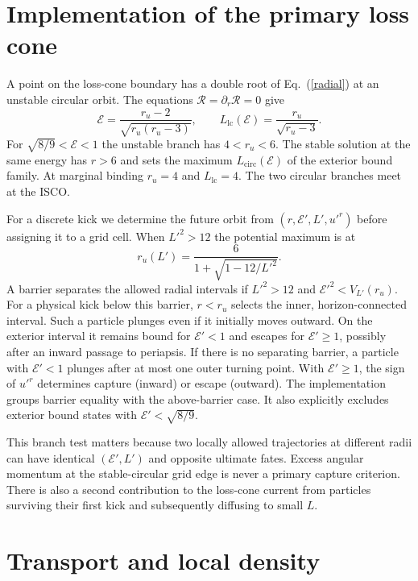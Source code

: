 \documentclass[aps,prd,reprint,amsmath,amssymb,nofootinbib]{revtex4-2}
\newcommand{\E}{\mathcal E}
\newcommand{\lc}{\mathrm{lc}}
\newcommand{\circsub}{\mathrm{circ}}
\begin{document}
\section{Implementation of the primary loss cone}
A point on the loss-cone boundary has a double root of Eq.~(\ref{radial}) at an unstable circular orbit. The equations $\mathcal R=\partial_r\mathcal R=0$ give~\cite{SFW}
\begin{equation}
 \E=\frac{r_u-2}{\sqrt{r_u(r_u-3)}},\qquad
 L_{\lc}(\E)=\frac{r_u}{\sqrt{r_u-3}} .
 \label{losscurve}
\end{equation}
For $\sqrt{8/9}<\E<1$ the unstable branch has $4<r_u<6$. The stable solution at the same energy has $r>6$ and sets the maximum $L_{\circsub}(\E)$ of the exterior bound family. At marginal binding $r_u=4$ and $L_{\lc}=4$. The two circular branches meet at the ISCO.

For a discrete kick we determine the future orbit from $(r,\E',L',u'^r)$ before assigning it to a grid cell. When $L'^2>12$ the potential maximum is at
\begin{equation}
 r_u(L')=\frac{6}{1+\sqrt{1-12/L'^2}} .
\end{equation}
A barrier separates the allowed radial intervals if $L'^2>12$ and $\E'^2<V_{L'}(r_u)$. For a physical kick below this barrier, $r<r_u$ selects the inner, horizon-connected interval. Such a particle plunges even if it initially moves outward. On the exterior interval it remains bound for $\E'<1$ and escapes for $\E'\ge1$, possibly after an inward passage to periapsis. If there is no separating barrier, a particle with $\E'<1$ plunges after at most one outer turning point. With $\E'\ge1$, the sign of $u'^r$ determines capture (inward) or escape (outward). The implementation groups barrier equality with the above-barrier case. It also explicitly excludes exterior bound states with $\E'<\sqrt{8/9}$.

This branch test matters because two locally allowed trajectories at different radii can have identical $(\E',L')$ and opposite ultimate fates. Excess angular momentum at the stable-circular grid edge is never a primary capture criterion. There is also a second contribution to the loss-cone current from particles surviving their first kick and subsequently diffusing to small $L$.

\section{Transport and local density}
\end{document}
